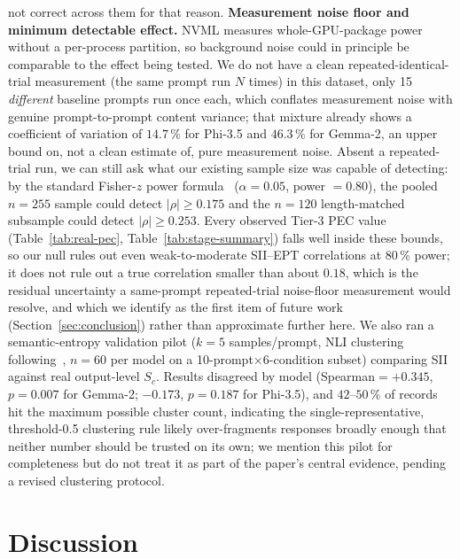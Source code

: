 \documentclass[conference]{IEEEtran}
\begin{document}
not correct across them for that reason.
\textbf{Measurement noise floor and minimum detectable effect.} NVML
measures whole-GPU-package power without a per-process partition, so
background noise could in principle be comparable to the effect being
tested. We do not have a clean repeated-identical-trial measurement
(the same prompt run $N$ times) in this dataset, only 15
\emph{different} baseline prompts run once each, which conflates
measurement noise with genuine prompt-to-prompt content variance;
that mixture already shows a coefficient of variation of $14.7\,\%$
for Phi-3.5 and $46.3\,\%$ for Gemma-2, an upper bound on, not a clean
estimate of, pure measurement noise. Absent a repeated-trial run, we
can still ask what our existing sample size was capable of detecting:
by the standard Fisher-$z$ power formula~\cite{cohen1988statistical}
($\alpha=0.05$, power $=0.80$), the pooled $n=255$ sample could detect
$|\rho|\geq0.175$ and the $n=120$ length-matched subsample could
detect $|\rho|\geq0.253$. Every observed Tier-3 PEC value
(Table~\ref{tab:real-pec}, Table~\ref{tab:stage-summary}) falls well
inside these bounds, so our null rules out even weak-to-moderate
SII--EPT correlations at 80\,\% power; it does not rule out a true
correlation smaller than about $0.18$, which is the residual
uncertainty a same-prompt repeated-trial noise-floor measurement would
resolve, and which we identify as the first item of future work
(Section~\ref{sec:conclusion}) rather than approximate further here.
We also ran a semantic-entropy validation pilot ($k=5$ samples/prompt,
NLI clustering following~\cite{kuhn2023semantic}, $n=60$ per model on
a 10-prompt$\times$6-condition subset) comparing SII against real
output-level $S_c$. Results disagreed by model
(Spearman$=+0.345$, $p=0.007$ for Gemma-2; $-0.173$, $p=0.187$ for
Phi-3.5), and $42$--$50\,\%$ of records hit the maximum possible
cluster count, indicating the single-representative, threshold-0.5
clustering rule likely over-fragments responses broadly enough that
neither number should be trusted on its own; we mention this pilot for
completeness but do not treat it as part of the paper's central
evidence, pending a revised clustering protocol.
\section{Discussion}
\label{sec:discussion}
\end{document}

